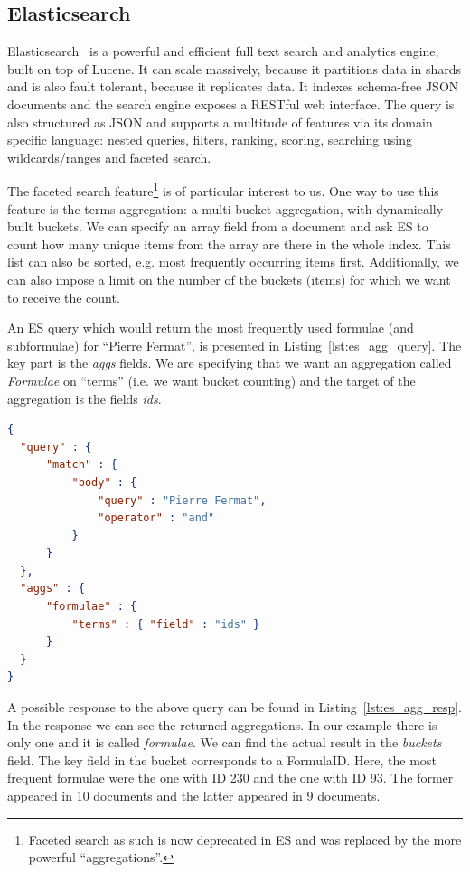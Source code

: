 \documentclass[a4paper,11pt,oneside]{article}
\begin{document}
\subsection{Elasticsearch}\label{subsec:prelim:els}
Elasticsearch~\cite{esl:online} is a powerful and efficient full text search
and analytics engine, built on top of Lucene. It can scale massively, because
it partitions data in shards and is also fault tolerant, because it replicates
data.  It indexes schema-free JSON documents and the search engine exposes a
RESTful web interface.  The query is also structured as JSON and supports a
multitude of features via its domain specific language:  nested queries,
filters, ranking, scoring, searching using wildcards/ranges and faceted search.

The faceted search feature\footnote{Faceted search as such is now deprecated in
ES and was replaced by the more powerful ``aggregations''.} is of particular
interest to us.
One way to use this feature is the terms aggregation: a multi-bucket
aggregation, with dynamically built buckets.
We can specify an array field from a document and ask ES to count how many
unique items from the array are there in the whole index.
This list can also be sorted, e.g. most frequently occurring items first.
Additionally, we can also impose a limit on the number of the buckets (items)
for which we want to receive the count.

An ES query which would return the most frequently used formulae (and
subformulae) for ``Pierre Fermat'', is presented in
Listing~\ref{lst:es_agg_query}. The key part is the \emph{aggs} fields. We are
specifying that we want an aggregation called \textit{Formulae} on ``terms''
(i.e. we want bucket counting) and the target of the aggregation is the fields
\emph{ids}.

\begin{lstlisting}[language=json,firstnumber=1,caption=Elastic Search Term
Aggregation Query, captionpos=b, label=lst:es_agg_query]
{
  "query" : {
      "match" : {
          "body" : {
              "query" : "Pierre Fermat",
              "operator" : "and"
          }
      }
  },
  "aggs" : {
      "formulae" : {
          "terms" : { "field" : "ids" }
      }
  }
}
\end{lstlisting}

A possible response to the above query can be found in
Listing~\ref{lst:es_agg_resp}. In the response we can see the returned
aggregations. In our example there is only one and it is called
\emph{formulae}. We can find the actual result in the \emph{buckets} field. The
\textsf{key} field in the bucket corresponds to a \textsf{FormulaID}.
Here, the most frequent formulae were the one with ID 230 and the one with ID
93. The former appeared in 10 documents and the latter appeared in 9 documents.
\end{document}
